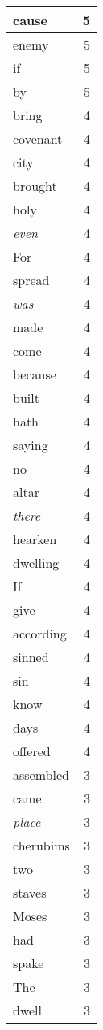 \begin{center}
\begin{longtable}{l|r}
cause & 5 \\ \hline
enemy & 5 \\ \hline
if & 5 \\ \hline
by & 5 \\ \hline
bring & 4 \\ \hline
covenant & 4 \\ \hline
city & 4 \\ \hline
brought & 4 \\ \hline
holy & 4 \\ \hline
\emph{even} & 4 \\ \hline
For & 4 \\ \hline
spread & 4 \\ \hline
\emph{was} & 4 \\ \hline
made & 4 \\ \hline
come & 4 \\ \hline
because & 4 \\ \hline
built & 4 \\ \hline
hath & 4 \\ \hline
saying & 4 \\ \hline
no & 4 \\ \hline
altar & 4 \\ \hline
\emph{there} & 4 \\ \hline
hearken & 4 \\ \hline
dwelling & 4 \\ \hline
If & 4 \\ \hline
give & 4 \\ \hline
according & 4 \\ \hline
sinned & 4 \\ \hline
sin & 4 \\ \hline
know & 4 \\ \hline
days & 4 \\ \hline
offered & 4 \\ \hline
assembled & 3 \\ \hline
came & 3 \\ \hline
\emph{place} & 3 \\ \hline
cherubims & 3 \\ \hline
two & 3 \\ \hline
staves & 3 \\ \hline
Moses & 3 \\ \hline
had & 3 \\ \hline
spake & 3 \\ \hline
The & 3 \\ \hline
dwell & 3 \\ \hline

\end{longtable}
\end{center}
